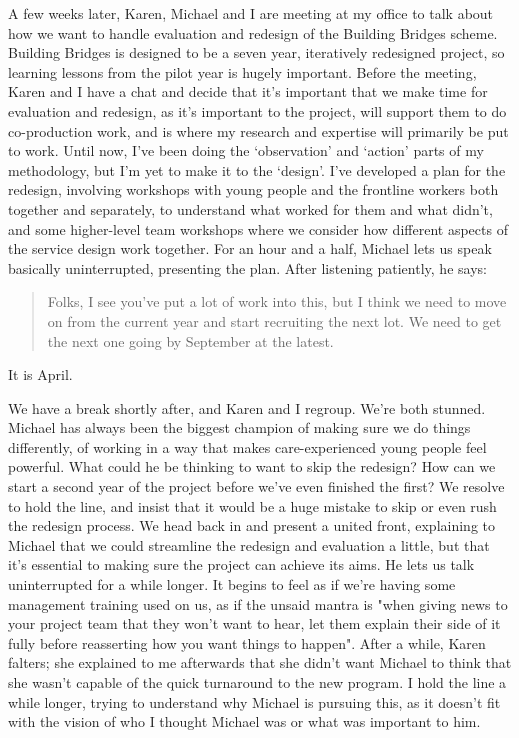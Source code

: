 A few weeks later, Karen, Michael and I are meeting at my office to talk about how we want to handle evaluation and redesign of the Building Bridges scheme. Building Bridges is designed to be a seven year, iteratively redesigned project, so learning lessons from the pilot year is hugely important. Before the meeting, Karen and I have a chat and decide that it's important that we make time for evaluation and redesign, as it's important to the project, will support them to do co-production work, and is where my research and expertise will primarily be put to work. Until now, I've been doing the `observation' and `action' parts of my methodology, but I'm yet to make it to the `design'. I've developed a plan for the redesign, involving workshops with young people and the frontline workers both together and separately, to understand what worked for them and what didn't, and some higher-level team workshops where we consider how different aspects of the service design work together. For an hour and a half, Michael lets us speak basically uninterrupted, presenting the plan. After listening patiently,  he says: 
\begin{quote}
Folks, I see you've put a lot of work into this, but I think we need to move on from the current year and start recruiting the next lot. We need to get the next one going by September at the latest.
\end{quote}
It is April. 

We have a break shortly after, and Karen and I regroup. We're both stunned. Michael has always been the biggest champion of making sure we do things differently, of working in a way that makes care-experienced young people feel powerful. What could he be thinking to want to skip the redesign? How can we start a second year of the project before we've even finished the first? We resolve to hold the line, and insist that it would be a huge mistake to skip or even rush the redesign process. We head back in and present a united front, explaining to Michael that we could streamline the redesign and evaluation a little, but that it's essential to making sure the project can achieve its aims. He lets us talk uninterrupted for a while longer. It begins to feel as if we're having some management training used on us, as if the unsaid mantra is "when giving news to your project team that they won't want to hear, let them explain their side of it fully before reasserting how you want things to happen". After a while, Karen falters; she explained to me afterwards that she didn't want Michael to think that she wasn't capable of the quick turnaround to the new program. I hold the line a while longer, trying to understand why Michael is pursuing this, as it doesn't fit with the vision of who I thought Michael was or what was important to him.

